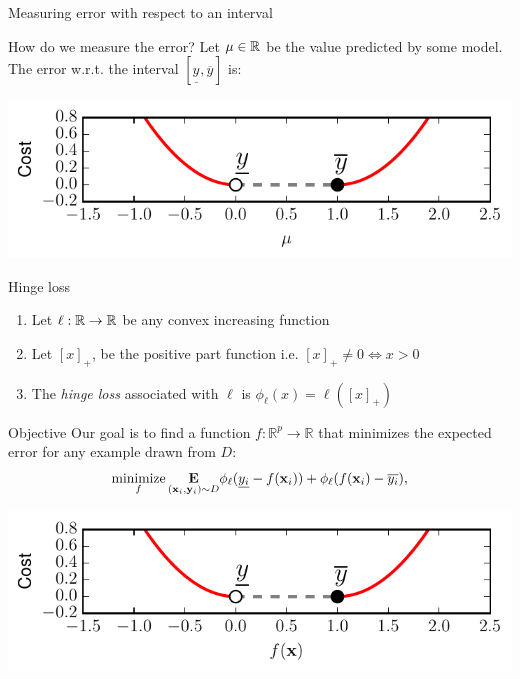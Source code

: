 \documentclass{beamer}
\newcommand{\ylower}[1]{\ensuremath{\underline{y_{#1}}}}
\newcommand{\yupper}[1]{\ensuremath{\overline{y_{#1}}}}
\DeclareMathOperator*{\minimize}{minimize}
\begin{document}
\begin{frame}{Measuring error with respect to an interval}
	\begin{block}{How do we measure the error?}
		Let $\mu \in \mathbb{R}$ be the value predicted by some model. The error w.r.t. the interval $[\ylower{}, \yupper{}]$ is:	
		\vspace{-2mm}
		\begin{center}
			\includegraphics[scale=0.8]{figures/objective/interval_loss.pdf}
		\end{center}
	\end{block}
	\pause
	\begin{block}{Hinge loss}
		\begin{enumerate}
			\item<+-> Let $\ell: \mathbb{R} \rightarrow \mathbb{R}$ be any convex increasing function
			\item<+-> Let $[x]_+$, be the positive part function i.e. $[x]_+ \not = 0 \Leftrightarrow x > 0$
			\item<+-> The \emph{hinge loss} associated with $\ell$ is $\phi_\ell(x) = \ell([x]_+)$
		\end{enumerate}
	\end{block}
\end{frame}

\begin{frame}{Objective}
	Our goal is to find a function $f:\mathbb R^p\rightarrow\mathbb R$ that minimizes the expected error for any example drawn from $D$:
	$$
	\minimize_{f} \underset{(\xb_i, \yb_i) \sim D}{\mathbf{E}} \phi_\ell(\ylower{i} - f(\xb_i)) + \phi_\ell(f(\xb_i) - \yupper{i}),
	$$
	\vspace{6mm}
	\begin{center}
		\includegraphics[scale=0.8]{figures/objective/interval_loss_fx.pdf}
	\end{center}
\end{frame}
\end{document}
